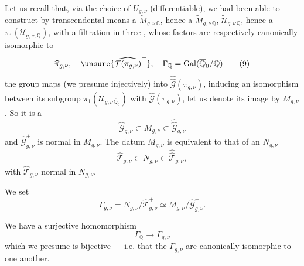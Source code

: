 
Let us recall that, via the choice of $U_{g,\nu}$ (differentiable), we had been able to construct by transcendental means a $\widetilde M_{g,\nu\,\mathbb C}$, hence a $\widetilde M_{g,\nu\,\mathbb Q}$,  $\widetilde{\mathcal U}_{g,\nu\,\mathbb Q}$, hence a $\pi_1(\mathcal U_{g,\nu,\mathbb Q})$, with a filtration in three , whose factors are respectively canonically isomorphic to
\[
\widehat{\pi}_{g,\nu},\quad
\unsure{\widehat{\mathcal T(\pi_{g,\nu})}^{+}},\quad
\Gamma_{\mathbb Q}=\mathrm{Gal}(\overline{\mathbb Q}_0/\mathbb Q)
\tag{9}
\]
the group maps (we presume injectively) into $\widehat{\widehat{\mathcal G}}(\pi_{g,\nu})$,  inducing an isomorphism between its subgroup $\pi_1(\mathcal U_{g,\nu\,\overline{\mathbb Q}_0})$ with $\widehat{\mathcal G}(\pi_{g,\nu})$, let us denote its image by $M_{g,\nu}$. So it is a  
\[
\widehat{\mathcal G}_{g,\nu}\subset M_{g,\nu}\subset\widehat{\widehat{\mathcal G}}_{g,\nu}
\tag{10}
\]
and $\widehat{\mathcal G}_{g,\nu}^{+}$ is normal in $M_{g,\nu}$. The datum  $M_{g,\nu}$ is equivalent to that of an $N_{g,\nu}$
\[
\widehat{\mathcal T}_{g,\nu}\subset N_{g,\nu}\subset\widehat{\widehat{\mathcal T}}_{g,\nu},
\tag{11}
\]
with $\widehat{\mathcal T}_{g,\nu}^{+}$ normal in $N_{g,\nu}$.

We set
\[
\Gamma_{g,\nu}=N_{g,\nu}/\widehat{\mathcal T}_{g,\nu}^{+}\simeq M_{g,\nu}/\widehat{\mathcal G}_{g,\nu}^{+}.
\tag{12}
\]

We have a surjective homomorphism
\[
\Gamma_{\mathbb Q}\longrightarrow\Gamma_{g,\nu}
\tag{13}
\]
which we presume is bijective --- i.e. that the $\Gamma_{g,\nu}$ are canonically isomorphic to one another.



